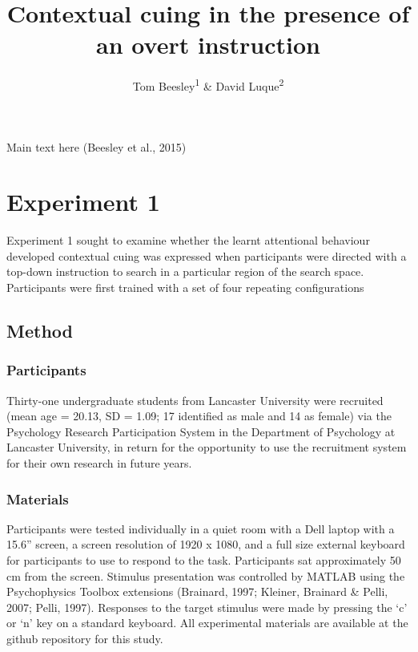 \documentclass[
  man]{apa7}
\title{Contextual cuing in the presence of an overt instruction}
\author{Tom Beesley\textsuperscript{1} \& David Luque\textsuperscript{2}}
\date{}
\affiliation{\vspace{0.5cm}\textsuperscript{1} Lancaster University, UK\\\textsuperscript{2} Universidad Autónoma de Madrid, Spain}
\begin{document}
\maketitle

Main text here (Beesley et al., 2015)

\hypertarget{experiment-1}{%
\section{Experiment 1}\label{experiment-1}}

Experiment 1 sought to examine whether the learnt attentional behaviour developed contextual cuing was expressed when participants were directed with a top-down instruction to search in a particular region of the search space. Participants were first trained with a set of four repeating configurations

\hypertarget{method}{%
\subsection{Method}\label{method}}

\hypertarget{participants}{%
\subsubsection{Participants}\label{participants}}

Thirty-one undergraduate students from Lancaster University were recruited (mean age = 20.13, SD = 1.09; 17 identified as male and 14 as female) via the Psychology Research Participation System in the Department of Psychology at Lancaster University, in return for the opportunity to use the recruitment system for their own research in future years.

\hypertarget{materials}{%
\subsubsection{Materials}\label{materials}}

Participants were tested individually in a quiet room with a Dell laptop with a 15.6'' screen, a screen resolution of 1920 x 1080, and a full size external keyboard for participants to use to respond to the task. Participants sat approximately 50 cm from the screen. Stimulus presentation was controlled by MATLAB using the Psychophysics Toolbox extensions (Brainard, 1997; Kleiner, Brainard \& Pelli, 2007; Pelli, 1997). Responses to the target stimulus were made by pressing the `c' or `n' key on a standard keyboard. All experimental materials are available at the github repository for this study.
\end{document}
